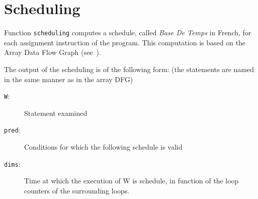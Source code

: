 \documentclass[a4paper]{report}
\newenvironment{PipsMake}{\begin{alltt}}{\end{alltt}}
\begin{document}


\section{Scheduling}
\label{subsection-scheduling}

Function \texttt{scheduling} computes a schedule, called {\em Base De
Temps} in French, for each assignment instruction of the program. This
computation is based on the Array Data Flow Graph (see~\cite{Fea92a,Fea92b}).

The output of the scheduling is of the following form:
(the statements are named in the same manner as in the array DFG)

\begin{description}
\item[\texttt{W}:] Statement examined
\item[\texttt{pred}:] Conditions for which the following schedule is
  valid
\item[\texttt{dims}:] Time at which the execution of W is schedule, in function of
  the loop counters of the surrounding loops.
\end{description}





\end{document}
